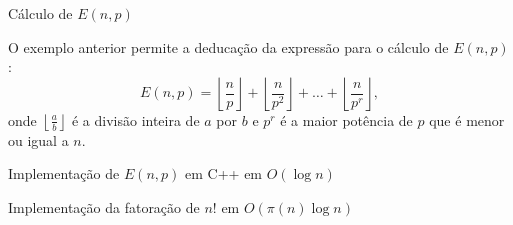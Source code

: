 \begin{frame}[fragile]{Cálculo de $E(n, p)$}

O exemplo anterior permite a deducação da expressão para o cálculo de $E(n,p)$:
$$
E(n, p) = \left\lfloor \frac{n}{p}\right\rfloor + \left\lfloor \frac{n}{p^2}\right\rfloor + \ldots + \left\lfloor \frac{n}{p^r}\right\rfloor,
$$
onde $\left\lfloor \frac{a}{b}\right\rfloor$ é a divisão inteira de $a$ por $b$ e $p^r$ é a maior potência de $p$ que é menor ou igual a $n$.

\end{frame}

\begin{frame}[fragile]{Implementação de $E(n, p)$ em C++ em $O(\log n)$}
\end{frame}

\begin{frame}[fragile]{Implementação da fatoração de $n!$ em $O(\pi(n)\log n)$}
\end{frame}
